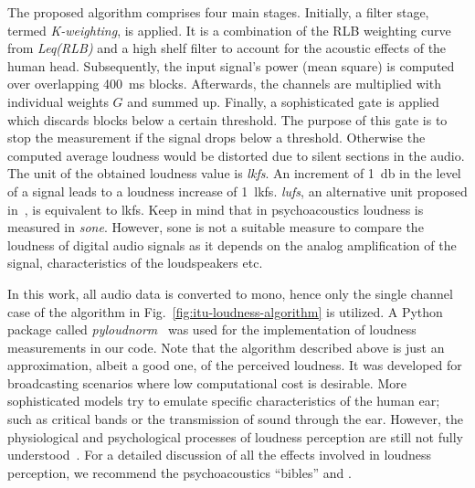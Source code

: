 The proposed algorithm comprises four main stages. Initially, a filter stage, termed \textit{K-weighting}, is applied. It is a combination of the RLB weighting curve from \textit{Leq(RLB)} and a high shelf filter to account for the acoustic effects of the human head. Subsequently, the input signal's power (mean square) is computed over overlapping \SI{400}{\milli\second} blocks. Afterwards, the channels are multiplied with individual weights $G$ and summed up. Finally, a sophisticated gate is applied which discards blocks below a certain threshold. The purpose of this gate is to stop the measurement if the signal drops below a threshold. Otherwise the computed average loudness would be distorted due to silent sections in the audio. The unit of the obtained loudness value is \textit{\gls{lkfs}}. An increment of \SI{1}{\decibel} in the level of a signal leads to a loudness increase of 1~\gls{lkfs}. \textit{\Gls{lufs}}, an alternative unit proposed in~\cite{ebu2020recommendation}, is equivalent to \gls{lkfs}. Keep in mind that in psychoacoustics loudness is measured in \textit{sone}. However, sone is not a suitable measure to compare the loudness of digital audio signals as it depends on the analog amplification of the signal, characteristics of the loudspeakers etc.\\

In this work, all audio data is converted to mono, hence only the single channel case of the algorithm in Fig.~\ref{fig:itu-loudness-algorithm} is utilized. A Python package called \textit{pyloudnorm}~\cite{steinmetz2021pyloudnorm} was used for the implementation of loudness measurements in our code. Note that the algorithm described above is just an approximation, albeit a good one, of the perceived loudness. It was developed for broadcasting scenarios where low computational cost is desirable. More sophisticated models try to emulate specific characteristics of the human ear; such as critical bands or the transmission of sound through the ear. However, the physiological and psychological processes of loudness perception are still not fully understood~\cite[p. 139]{moore2012introduction}. For a detailed discussion of all the effects involved in loudness perception, we recommend the psychoacoustics \enquote{bibles} \cite{zwicker2013psychoacoustics} and \cite{moore2012introduction}.
